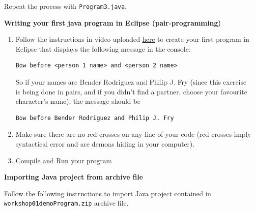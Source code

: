 \begin{questions}
Repeat the process with \texttt{Program3.java}.

\question \textbf{Writing your first java program in Eclipse (pair-programming)} \vskip 0.5cm

\begin{enumerate}
\item Follow the instructions in video uploaded \href{https://www.youtube.com/watch?v=8DcIQcmwuSE}{here} to create your first program in Eclipse that displays the following message in the console:

\begin{verbatim}
Bow before <person 1 name> and <person 2 name>
\end{verbatim}

So if your names are Bender Rodriguez and Philip J. Fry (since this exercise is being done in pairs, and if you didn't find a partner, choose your favourite character's name), the message should be

\begin{verbatim}
Bow before Bender Rodriguez and Philip J. Fry
\end{verbatim}

\item Make sure there are no red-crosses on any line of your code (red crosses imply syntactical error and are demons hiding in your computer).

\item Compile and Run your program
\end{enumerate}

\newpage

\question \textbf{Importing Java project from archive file} \vskip 0.5cm

Follow the following instructions to import Java project contained in \texttt{workshop01demoProgram.zip} archive file.


\end{questions}
